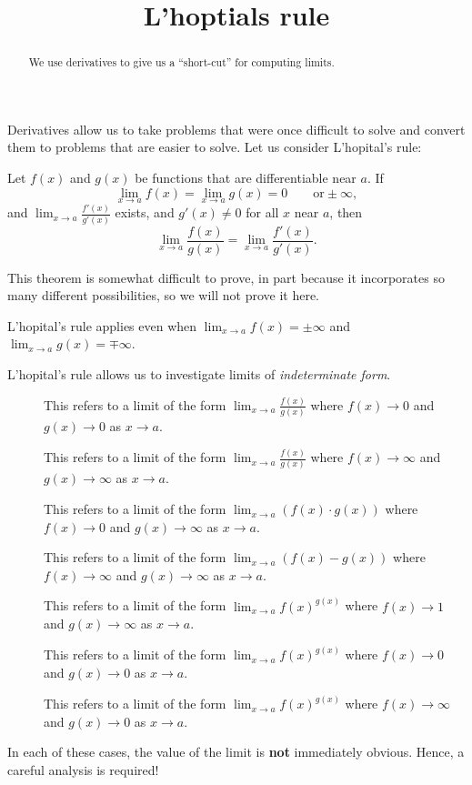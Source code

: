 \documentclass{ximera}
\title[Dig-In:]{L'hoptials rule}
\begin{document}
\begin{abstract}
  We use derivatives to give us a ``short-cut'' for computing limits.
\end{abstract}
\maketitle

Derivatives allow us to take problems that were once difficult to
solve and convert them to problems that are easier to solve. Let us
consider L'hopital's rule:

\begin{theorem} 
Let $f(x)$ and $g(x)$ be functions that are differentiable near $a$.  If
\[
\lim_{x \to a} f(x) = \lim_{x \to a}g(x) = 0 \qquad \text{or} \pm \infty,
\]
and $\lim_{x \to a} \frac{f'(x)}{g'(x)}$ exists, and $g'(x) \neq 0$
for all $x$ near $a$, then 
\[
\lim_{x \to a} \frac{f(x)}{g(x)} = \lim_{x \to a} \frac{f'(x)}{g'(x)}.
\]
\end{theorem}

This theorem is somewhat difficult to prove, in part because it
incorporates so many different possibilities, so we will not prove it
here. 
\begin{remark}
  L'hopital's rule applies even when $\lim_{x\to a}f(x) = \pm \infty$
  and $\lim_{x\to a}g(x) = \mp \infty$.
\end{remark}


L'hopital's rule allows us to investigate limits of
\textit{indeterminate form}.

\begin{definition}\hfil
\begin{description}
\item[\zeroOverZero] This refers to a limit of the form $\lim_{x\to a}
  \frac{f(x)}{g(x)}$ where $f(x)\to 0$ and $g(x)\to 0$ as $x\to a$.
\item[\inftyOverInfty] This refers to a limit of the form $\lim_{x\to a}
  \frac{f(x)}{g(x)}$ where $f(x)\to \infty$ and $g(x)\to \infty$ as $x\to a$.
\item[\zeroOverInfty] This refers to a limit of the form $\lim_{x\to a}
  \left(f(x)\cdot g(x)\right)$ where $f(x)\to 0$ and $g(x)\to \infty$ as $x\to a$.
\item[\inftyMinusInfty] This refers to a limit of the form $\lim_{x\to a}\left(
  f(x)-g(x)\right)$ where $f(x)\to \infty$ and $g(x)\to \infty$ as $x\to a$.
\item[\oneToInfty] This refers to a limit of the form $\lim_{x\to a}
  f(x)^{g(x)}$ where $f(x)\to 1$ and $g(x)\to \infty$ as $x\to a$.
\item[\zeroToZero] This refers to a limit of the form $\lim_{x\to a}
  f(x)^{g(x)}$ where $f(x)\to 0$ and $g(x)\to 0$ as $x\to a$.
\item[\inftyToZero] This refers to a limit of the form $\lim_{x\to a}
  f(x)^{g(x)}$ where $f(x)\to \infty$ and $g(x)\to 0$ as $x\to a$.
\end{description}
In each of these cases, the value of the limit is \textbf{not} immediately
obvious. Hence, a careful analysis is required!
\end{definition}
\end{document}
